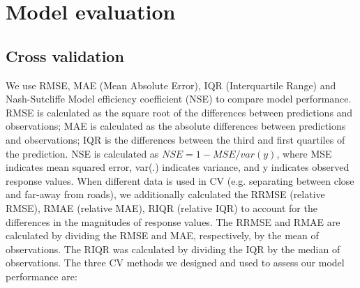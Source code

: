 \documentclass{article}
\begin{document}
\section{Model evaluation}

\subsection{Cross validation}
We use RMSE, MAE (Mean Absolute Error), IQR (Interquartile Range) and Nash-Sutcliffe Model efficiency coefficient (NSE) to compare model performance. RMSE is calculated as the square root of the differences between predictions and observations; MAE is calculated as the absolute differences between predictions and observations; IQR is the differences between the third and first quartiles of the prediction. NSE is calculated as $NSE = 1- MSE / var(y)$, where MSE indicates mean squared error, var(.) indicates variance, and y indicates observed response values. %
When different data is used in CV (e.g. separating between close and far-away from roads), we additionally calculated the RRMSE (relative RMSE), RMAE (relative MAE), RIQR (relative IQR) to account for the differences in the magnitudes of response values. The RRMSE and RMAE are calculated by dividing the RMSE and MAE, respectively, by the mean of observations. The RIQR was calculated by dividing the IQR by the median of observations. The three CV methods we designed and used to assess our model performance are: 
\end{document}
